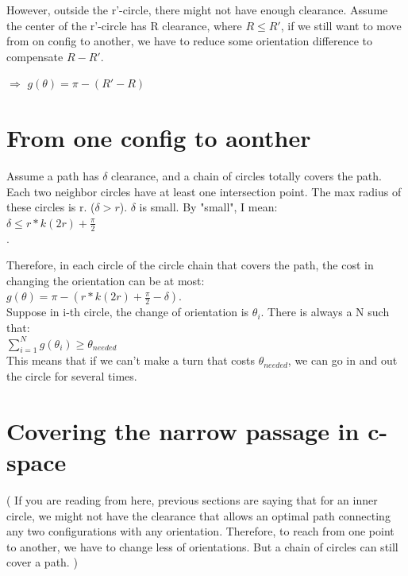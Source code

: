 \documentclass[12pt]{article}
\begin{document}
  However, outside the r'-circle, there might not have enough clearance. Assume the center of the r'-circle has R clearance, where $R \leq R' $, if we still want to move from on config to another, we have to reduce some orientation difference to compensate $R-R'$.

  $\Longrightarrow$ $g(\theta) = \pi - (R'-R)$ \\

  \section{From one config to aonther}

  Assume a path has $\delta$ clearance, and a chain of circles totally covers the path. Each two neighbor circles have at least one intersection point. The max radius of these circles is r. ($\delta > r$). $\delta$ is small. By "small", I mean:\\

  $\delta \leq r*k(2r) + \frac{\pi}{2}$\\.

  Therefore, in each circle of the circle chain that covers the path, the cost in changing the orientation can be at most:\\

  $g(\theta) = \pi - ( r*k(2r) + \frac{\pi}{2} - \delta)$.\\

  Suppose in i-th circle, the change of orientation is $\theta_{i}$. There is always a N such that:\\

  $\sum\limits_{i = 1}^N g(\theta_{i}) \geq \theta_{needed}$\\
  
  This means that if we can't make a turn that costs $\theta_{needed}$, we can go in and out the circle for several times.

  \section{Covering the narrow passage in c-space}

  ( If you are reading from here, previous sections are saying that for an inner circle, we might not have the clearance that allows an optimal path connecting any two configurations with any orientation. Therefore, to reach from one point to another, we have to change less of orientations. But a chain of circles can still cover a path. )\\
\end{document}
